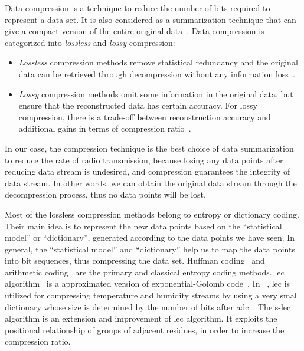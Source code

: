 
Data compression is a technique to reduce the number of bits required to
represent a data set. It is also considered as a summarization technique
that can give a compact version of the entire original
data~\cite{hesabi2015data}. Data compression is categorized into
\emph{lossless} and \emph{lossy} compression:
\begin{itemize}
    \item \emph{Lossless} compression methods remove statistical redundancy and
    the original data can be retrieved through decompression without any
    information loss~\cite{hesabi2015data}.
    \item \emph{Lossy} compression methods omit some information in the original
    data, but ensure that the reconstructed data has certain accuracy. For lossy
    compression, there is a trade-off between reconstruction accuracy and
    additional gains in terms of compression ratio~\cite{zordan2014performance}.
\end{itemize}

In our case, the compression technique is the best choice of data summarization
to reduce the rate of radio transmission, because losing any data points after
reducing data stream is undesired, and compression guarantees the integrity of
data stream. In other words, we can obtain the original data stream through the
decompression process, thus no data points will be lost.

Most of the lossless compression methods belong to entropy or dictionary coding.
Their main idea is to represent the new data points based on the ``statistical
model'' or ``dictionary'', generated according to the data points we have seen.
In general, the ``statistical model'' and ``dictionary'' help us to map the data
points into bit sequences, thus compressing the data set. Huffman
coding~\cite{huffman1952method} and arithmetic
coding~\cite{langdon1984introduction} are the primary and classical entropy
coding methods. \acrfull{lec} algorithm~\cite{marcelloni2008simple} is a
approximated version of exponential-Golomb code~\cite{teuhola1978compression}.
In ~\cite{marcelloni2008simple}, \acrshort{lec} is utilized for compressing
temperature and humidity streams by using a very small dictionary whose size is
determined by the number of bits after
\acrfull{adc}~\cite{marcelloni2008simple,marcelloni2009efficient}. The
\acrfull{s-lec}~\cite{li2016temporal} algorithm is an extension and improvement
of \acrshort{lec} algorithm. It exploits the positional relationship of groups
of adjacent residues, in order to increase the compression ratio.

